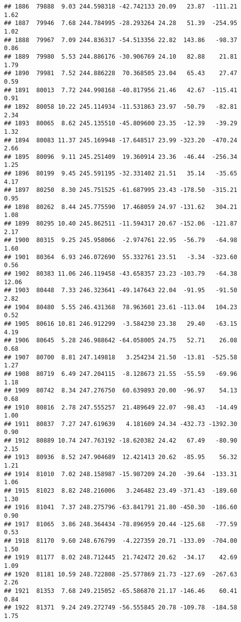 \documentclass[]{article}
\begin{document}
\begin{verbatim}
## 1886  79888  9.03 244.598318 -42.742133 20.09   23.87  -111.21  1.62
## 1887  79946  7.68 244.784995 -28.293264 24.28   51.39  -254.95  1.02
## 1888  79967  7.09 244.836317 -54.513356 22.82  143.86   -98.37  0.86
## 1889  79980  5.53 244.886176 -30.906769 24.10   82.88    21.81  1.79
## 1890  79981  7.52 244.886228  70.368505 23.04   65.43    27.47  0.59
## 1891  80013  7.72 244.998168 -40.817956 21.46   42.67  -115.41  0.91
## 1892  80058 10.22 245.114934 -11.531863 23.97  -50.79   -82.81  2.34
## 1893  80065  8.62 245.135510 -45.809600 23.35  -12.39   -39.29  1.32
## 1894  80083 11.37 245.169948 -17.648517 23.99 -323.20  -470.24  2.66
## 1895  80096  9.11 245.251409  19.360914 23.36  -46.44  -256.34  1.25
## 1896  80199  9.45 245.591195 -32.331402 21.51   35.14   -35.65  4.17
## 1897  80250  8.30 245.751525 -61.687995 23.43 -178.50  -315.21  0.95
## 1898  80262  8.44 245.775590  17.468059 24.97 -131.62   304.21  1.08
## 1899  80295 10.40 245.862511 -11.594317 20.67 -152.06  -121.87  2.17
## 1900  80315  9.25 245.958066  -2.974761 22.95  -56.79   -64.98  1.60
## 1901  80364  6.93 246.072690  55.332761 23.51   -3.34  -323.60  0.56
## 1902  80383 11.06 246.119458 -43.658357 23.23 -103.79   -64.38 12.06
## 1903  80448  7.33 246.323641 -49.147643 22.04  -91.95   -91.50  2.82
## 1904  80480  5.55 246.431368  78.963601 23.61 -113.04   104.23  0.52
## 1905  80616 10.81 246.912299  -3.584230 23.38   29.40   -63.15  4.19
## 1906  80645  5.28 246.988642 -64.058005 24.75   52.71    26.08  0.68
## 1907  80700  8.81 247.149818   3.254234 21.50  -13.81  -525.58  1.27
## 1908  80719  6.49 247.204115  -8.128673 21.55  -55.59   -69.96  1.18
## 1909  80742  8.34 247.276750  60.639893 20.00  -96.97    54.13  0.68
## 1910  80816  2.78 247.555257  21.489649 22.07  -98.43   -14.49  1.00
## 1911  80837  7.27 247.619639   4.181609 24.34 -432.73 -1392.30  0.90
## 1912  80889 10.74 247.763192 -18.620382 24.42   67.49   -80.90  2.15
## 1913  80936  8.52 247.904689  12.421413 20.62  -85.95    56.32  1.21
## 1914  81010  7.02 248.158987 -15.987209 24.20  -39.64  -133.31  1.06
## 1915  81023  8.82 248.216006   3.246482 23.49 -371.43  -189.60  1.30
## 1916  81041  7.37 248.275796 -63.841791 21.80 -450.30  -186.60  0.90
## 1917  81065  3.86 248.364434 -78.896959 20.44 -125.68   -77.59  0.53
## 1918  81170  9.60 248.676799  -4.227359 20.71 -133.09  -704.00  1.50
## 1919  81177  8.02 248.712445  21.742472 20.62  -34.17    42.69  1.09
## 1920  81181 10.59 248.722808 -25.577869 21.73 -127.69  -267.63  2.26
## 1921  81353  7.68 249.215052 -65.586870 21.17 -146.46    60.41  0.84
## 1922  81371  9.24 249.272749 -56.555845 20.78 -109.78  -184.58  1.75

\end{verbatim}
\end{document}
